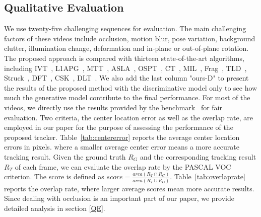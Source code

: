 \documentclass[preprint,12pt,review]{elsarticle}
\begin{document}
\subsection{Qualitative Evaluation}
We use twenty-five challenging sequences for evaluation.
The main challenging factors of these videos include occlusion, motion blur, pose variation, background clutter, illumination change, deformation and in-plane or out-of-plane rotation.
The proposed approach is compared with thirteen state-of-the-art algorithms, including IVT~\cite{ross2008incremental}, L1APG~\cite{bao2012real},  MTT~\cite{zhang2012robust}, ASLA~\cite{jia2012visual}, OSPT~\cite{wang2013online}, CT~\cite{zhang2012real}, MIL~\cite{babenko2009visual}, Frag~\cite{adam2006Frag}, TLD~\cite{kalal2010pn}, Struck~\cite{hare2011struck}, DFT~\cite{sevilla2012distribution}, CSK~\cite{henriques2012exploiting}, DLT~\cite{wang2013learning}.
We also add the last column "ours-D" to present the results of the proposed method with the discriminative model only to see how much the generative model contribute to the final performance. 
For most of the videos, we directly use the results provided by the benchmark~\cite{wu2013online} for fair evaluation.
Two criteria, the center location error as well as the overlap rate, are employed in our paper for the purpose of assessing the performance of the proposed tracker.
Table~\ref{tab:centererror} reports the average center location errors in pixels. where a smaller average center error means a more accurate tracking result.
Given the ground truth ${R_G}$ and the corresponding tracking result ${R_T}$ of each frame, we can evaluate the overlap rate by the PASCAL VOC~\cite{everingham2010pascal} criterion.
The score is defined as $score = \frac{{area({R_T} \cap {R_G})}}{{area({R_T} \cup {R_G})}} $.
Table~\ref{tab:overlaprate} reports the overlap rate, where larger average scores mean more accurate results.
Since dealing with occlusion is an important part of our paper, we provide detailed analysis in section \ref{QE}. 
\end{document}
